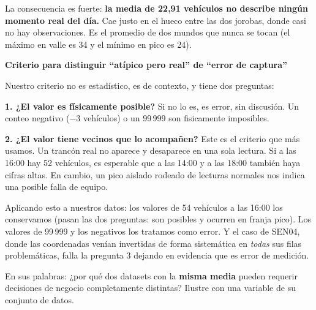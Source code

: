 \documentclass[11pt]{article}
\begin{document}
\begin{respuesta}[Respuesta 1.4]
La consecuencia es fuerte: \textbf{la media de 22,91 vehículos no describe ningún momento real del día.} Cae justo en el hueco entre las dos jorobas, donde casi no hay observaciones. Es el promedio de dos mundos que nunca se tocan (el máximo en valle es 34 y el mínimo en pico es 24).

\medskip
\noindent\textbf{Criterio para distinguir ``atípico pero real'' de ``error de captura''}

Nuestro criterio no es estadístico, es de contexto, y tiene dos preguntas:

\textbf{1. ¿El valor es físicamente posible?} Si no lo es, es error, sin discusión. Un conteo negativo ($-3$ vehículos) o un 99\,999 son fisicamente imposibles.

\textbf{2. ¿El valor tiene vecinos que lo acompañen?} Este es el criterio que más usamos. Un trancón real no aparece y desaparece en una sola lectura. Si a las 16:00 hay 52 vehículos, es esperable que a las 14:00 y a las 18:00 también haya cifras altas. En cambio, un pico aislado rodeado de lecturas normales nos indica una posible falla de equipo.

Aplicando esto a nuestros datos: los valores de 54 vehículos a las 16:00 los conservamos (pasan las dos preguntas: son posibles y ocurren en franja pico). Los valores de 99\,999 y los negativos los tratamos como error. Y el caso de SEN04, donde las coordenadas venían invertidas de forma sistemática en \emph{todas} sus filas problemáticas, falla la pregunta 3 dejando en evidencia que es error de medición.
\end{respuesta}


\begin{pregunta}
En sus palabras: ¿por qué dos datasets con la \textbf{misma media} pueden requerir decisiones de negocio completamente distintas? Ilustre con una variable de su conjunto de datos.
\end{pregunta}
\end{document}
